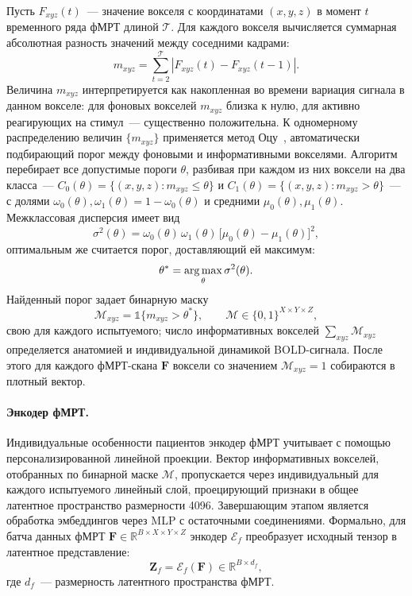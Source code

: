 Пусть $F_{xyz}(t)$~--- значение вокселя с координатами $(x, y, z)$ в момент $t$ временного ряда фМРТ длиной $\mathcal{T}$. Для каждого вокселя вычисляется суммарная абсолютная разность значений между соседними кадрами:
\begin{equation*}\label{eq:mask_score}
m_{xyz} = \sum_{t=2}^{\mathcal{T}} \left| F_{xyz}(t) - F_{xyz}(t-1) \right|.
\end{equation*}
Величина $m_{xyz}$ интерпретируется как накопленная во времени вариация сигнала в данном вокселе: для фоновых вокселей $m_{xyz}$ близка к нулю, для активно реагирующих на стимул~--- существенно положительна. К одномерному распределению величин $\{m_{xyz}\}$ применяется метод Оцу~\cite{otsu1975threshold}, автоматически подбирающий порог между фоновыми и информативными вокселями. Алгоритм перебирает все допустимые пороги $\theta$, разбивая при каждом из них воксели на два класса~--- $C_0(\theta) = \{(x, y, z) : m_{xyz} \le \theta\}$ и $C_1(\theta) = \{(x, y, z) : m_{xyz} > \theta\}$~--- с долями $\omega_0(\theta), \omega_1(\theta) = 1 - \omega_0(\theta)$ и средними $\mu_0(\theta), \mu_1(\theta)$. Межклассовая дисперсия имеет вид
\begin{equation*}\label{eq:otsu_var}
\sigma^2(\theta) = \omega_0(\theta)\, \omega_1(\theta)\, \big[\mu_0(\theta) - \mu_1(\theta)\big]^2,
\end{equation*}
оптимальным же считается порог, доставляющий ей максимум:
\begin{equation*}\label{eq:otsu_threshold}
\theta^* = \operatorname*{arg\,max}_{\theta} \sigma^2(\theta).
\end{equation*}
Найденный порог задает бинарную маску
\begin{equation}\label{eq:mask}
\mathcal{M}_{xyz} = \mathds{1}\{m_{xyz} > \theta^*\}, \qquad \mathcal{M} \in \{0, 1\}^{X \times Y \times Z},
\end{equation}
свою для каждого испытуемого; число информативных вокселей $\sum_{xyz} \mathcal{M}_{xyz}$ определяется анатомией и индивидуальной динамикой BOLD-сигнала. После этого для каждого фМРТ-скана $\mathbf{F}$ воксели со значением $\mathcal{M}_{xyz} = 1$ собираются в плотный вектор.

\paragraph{Энкодер фМРТ.}
Индивидуальные особенности пациентов энкодер фМРТ учитывает с помощью персонализированной линейной проекции. Вектор информативных вокселей, отобранных по бинарной маске $\mathcal{M}$, пропускается через индивидуальный для каждого испытуемого линейный слой, проецирующий признаки в общее латентное пространство размерности 4096. Завершающим этапом является обработка эмбеддингов через MLP с остаточными соединениями. Формально, для батча данных фМРТ $\mathbf{F} \in \mathbb{R}^{B \times X \times Y \times Z}$ энкодер $\mathcal{E}_{f}$ преобразует исходный тензор в латентное представление:
\begin{equation*}
\mathbf{Z}_{f} = \mathcal{E}_{f}(\mathbf{F}) \in \mathbb{R}^{B \times d_{f}},
\end{equation*}
где $d_{f}$~--- размерность латентного пространства фМРТ.

